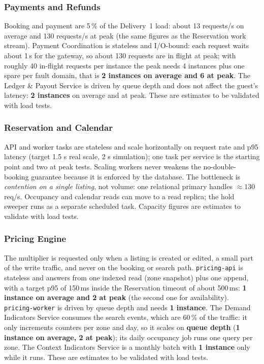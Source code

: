 \subsubsection{Payments and Refunds}
\label{sec:pay-scaling}

Booking and payment are 5\,\% of the Delivery~1 load: about 13 requests/s on
average and 130 requests/s at peak (the same figures as the Reservation work
stream). Payment Coordination is stateless and I/O-bound: each request waits
about 1\,s for the gateway, so about 130 requests are in flight at peak; with
roughly 40 in-flight requests per instance the peak needs 4 instances plus one
spare per fault domain, that is \textbf{2 instances on average and 6 at
peak}. The Ledger \& Payout Service is driven by queue depth and does not
affect the guest's latency: \textbf{2 instances} on average and at peak.
These are estimates to be validated with load tests.

\subsubsection{Reservation and Calendar}
API and worker tasks are stateless and scale horizontally on request rate and
p95 latency (target 1.5 s real scale, 2 s simulation); one task per service
is the starting point and two at peak tests. Scaling workers never weakens the
no-double-booking guarantee because it is enforced by the database. The
bottleneck is \emph{contention on a single listing}, not volume: one relational
primary handles $\approx 130$ req/s. Occupancy and calendar reads can move to a
read replica; the hold sweeper runs as a separate scheduled task. Capacity
figures are estimates to validate with load tests.

\begingroup
\setlength{\emergencystretch}{3em}
\subsubsection{Pricing Engine}
\label{sec:price-scaling}

The multiplier is requested only when a listing is created or edited, a small
part of the write traffic, and never on the booking or search path.
\texttt{pricing-api} is stateless and answers from one indexed read (zone
snapshot) plus one append, with a target p95 of 150\,ms inside the
Reservation timeout of about 500\,ms: \textbf{1 instance on average and 2 at
peak} (the second one for availability). \texttt{pricing-worker} is driven by
queue depth and needs \textbf{1 instance}. The Demand Indicators Service
consumes the search events, which are 60\,\% of the traffic: it only
increments counters per zone and day, so it scales on \textbf{queue depth}
(\textbf{1 instance on average, 2 at peak}); its daily occupancy job runs one
query per zone. The Context Indicators Service is a monthly batch with
\textbf{1 instance} only while it runs. These are estimates to be validated
with load tests.
\endgroup


